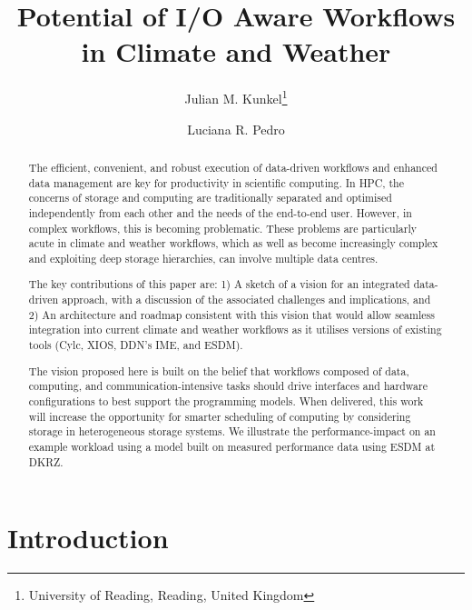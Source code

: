 \documentclass{superfri}
\begin{document}
\author{Julian M. Kunkel\footnote{\label{uread}University of Reading, Reading, United Kingdom} \and Luciana R. Pedro
}

\title{Potential of I/O Aware Workflows in Climate and Weather}

\maketitle{}

\begin{abstract}
The efficient, convenient, and robust execution of data-driven workflows and enhanced data management are key for productivity in scientific computing.
In HPC, the concerns of storage and computing are traditionally separated and optimised independently from each other and the needs of the end-to-end user. However, in complex workflows, this is becoming problematic. These problems are particularly acute in climate and weather workflows, which as well as become increasingly complex and exploiting deep storage hierarchies, can involve multiple data centres.

The key contributions of this paper are:
1) A sketch of a vision for an integrated data-driven approach, with a discussion of the associated challenges and implications, and 2) An architecture and roadmap consistent with this vision that would allow seamless integration into current climate and weather workflows as it utilises versions of existing tools (Cylc, XIOS, DDN's IME, and ESDM).

The vision proposed here is built on the belief that workflows composed of data, computing, and communication-intensive tasks should drive interfaces and hardware configurations to best support the programming models.
When delivered, this work will increase the opportunity for smarter scheduling of computing by considering storage in heterogeneous storage systems.
We illustrate the performance-impact on an example workload using a model built on measured performance data using ESDM at DKRZ.

\end{abstract}


\section*{Introduction}
\label{sec:intro}
\end{document}
